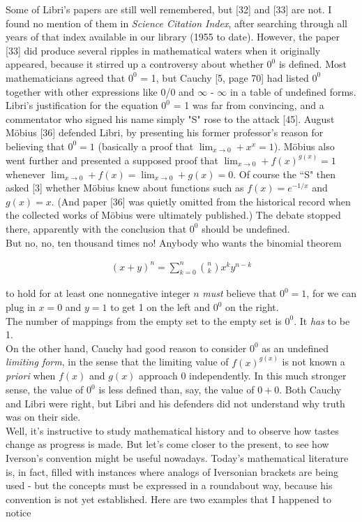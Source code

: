 \documentclass[10pt]{article}
\begin{document}
\indent Some of Libri's papers are still well remembered, but [32] and [33] are not. I found no mention of them in {\em{Science Citation Index}},  after searching through all years of that index available in our library (1955 to date). However, the paper [33] did produce several ripples in mathematical waters when it originally appeared, because it stirred up a controversy about whether $0^0$ is defined. Most mathematicians agreed that $0^0$ = 1, but Cauchy [5, page 70] had listed $0^0$ together with other expressions like 0/0 and $\infty$ - $\infty$ in a table of undefined forms. Libri's justification for the equation $0^0$ = 1  was far from convincing, and a commentator who signed his name simply "S" rose to the attack [45].  August M\"obius [36] defended Libri, by presenting his former professor's reason for believing that $0^0 = 1$  (basically a proof that $\lim_{x\to 0} + x^x = 1$). M\"obius also went further and presented a supposed proof that $\lim_{x\to 0} + f(x)^{g(x)} = 1 $ whenever $\lim_{x\to 0} + f(x) = \lim_{x\to 0} + g(x) = 0$. Of course the ``S"  then asked [3] whether M\"obius knew about functions such as $f(x) = e^{-1/x}$ and $g(x) = x$.  (And paper [36] was quietly omitted from the historical record when the collected works of M\"obius were ultimately published.) The debate stopped there, apparently with the conclusion that $0^0$ should be undefined.
\\
\indent But no, no, ten thousand times no! Anybody who wants the binomial theorem

\begin{align}
    (x+y)^{n} = \sum_{k=0}^{n} \binom{n}{k} x^k y^{n-k}
\end{align}

\noindent to hold for at least one nonnegative integer $n$ {\em{must}} believe that $0^0 = 1$, for we can plug in $x = 0$ and $y=1$ to get 1 on the left and $0^0$ on the right.
\\
\indent The number of mappings from the empty set to the empty set is $0^0$. It {\em{has}} to be 1.
\\
\indent On the other hand, Cauchy had good reason to consider $0^0$ as an undefined {\em{limiting form}},  in the sense that the limiting value of $f(x)^{g(x)}$ is not known a {\em{priori}} when $f(x)$ and $g(x)$ approach 0 independently. In this much stronger sense, the value of $0^0$ is less defined than, say, the value of $0+0$. Both Cauchy and Libri were right, but Libri and his defenders did not understand why truth was on their side.
\\
\indent Well, it's instructive to study mathematical history and to observe how tastes change as progress is made. But let's come closer to the present, to see how Iverson's convention might be useful nowadays. Today's mathematical literature is, in fact, filled with instances where analogs of Iversonian brackets are being used - but the concepts must be expressed in a roundabout way, because his convention is not yet established. Here are two examples that I happened to notice
\end{document}
